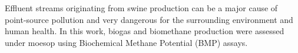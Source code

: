 Effluent streams originating from swine production can be a major cause of point-source pollution and very dangerous for the surrounding environment and human health. In this work, biogas and biomethane production were assessed under moesop using Biochemical Methane Potential (BMP) assays.